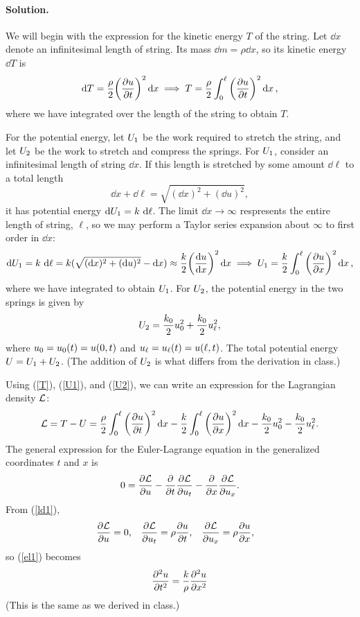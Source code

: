 \documentclass[11pt]{article}
\newcommand{\refeq}[1]{(\ref{#1})}
\newenvironment{solution}
{
    \paragraph{Solution.}
    \ignorespaces
}
{
}
\begin{document}
\begin{solution}
	We will begin with the expression for the kinetic energy $T$ of the string.  Let $\dd{x}$ denote an infinitesimal length of string.  Its mass $\dd{m} = \rho \dd{x}$, so its kinetic energy $\dd{T}$ is
\begin{equation} \label{T}
	\dd{T} = \frac{\rho}{2} \bigg( \pdv{u}{t} \bigg)^2 \dd{x} \implies T = \frac{\rho}{2} \int_0^\ell \bigg( \pdv{u}{t} \bigg)^2 \dd{x},
\end{equation}
	where we have integrated over the length of the string to obtain $T$.
	
	For the potential energy, let $U_1$ be the work required to stretch the string, and let $U_2$ be the work to stretch and compress the springs.  For $U_1$, consider an infinitesimal length of string $\dd{x}$.  If this length is stretched by some amount $\dd{\ell}$ to a total length
	\begin{equation}
		\dd{x} + \dd{\ell} = \sqrt{(\dd{x})^2 + (\dd{u})^2},
	\end{equation}
	it has potential energy $\dd{U_1} = k \,\dd{\ell}$.  The limit $\dd{x} \to \infty$ respresents the entire length of string, $\ell$, so we may perform a Taylor series expansion about $\infty$ to first order in $\dd{x}$:
	\begin{equation} \label{U1}
		\dd{U_1} = k \,\dd{\ell} = k (\sqrt{(\dd{x})^2 + (\dd{u})^2} - \dd{x}) \approx \frac{k}{2} \bigg( \dv{u}{x} \bigg)^2 \dd{x} \implies U_1 = \frac{k}{2} \int_0^\ell \bigg( \pdv{u}{x} \bigg)^2 \dd{x},
	\end{equation}
	where we have integrated to obtain $U_1$.  For $U_2$, the potential energy in the two springs is given by
	\begin{equation} \label{U2}
		U_2 = \frac{k_0}{2} u_0^2 + \frac{k_0}{2} u_\ell^2,
	\end{equation}
	where $u_0 = u_0(t) = u(0, t)$ and $u_\ell = u_\ell(t) = u(\ell, t)$.  The total potential energy $U = U_1 + U_2$.  (The addition of $U_2$ is what differs from the derivation in class.)
	
	Using \refeq{T}, \refeq{U1}, and \refeq{U2}, we can write an expression for the Lagrangian density $\mathcal{L}$:
	\begin{equation} \label{ld1}
		\mathcal{L} = T - U = \frac{\rho}{2} \int_0^\ell \bigg( \pdv{u}{t} \bigg)^2 \dd{x} - \frac{k}{2} \int_0^\ell \bigg( \pdv{u}{x} \bigg)^2 \dd{x} - \frac{k_0}{2} u_0^2 - \frac{k_0}{2} u_\ell^2.
	\end{equation}
	The general expression for the Euler-Lagrange equation in the generalized coordinates $t$ and $x$ is
	\begin{equation} \label{el1}
		0 = \pdv{\mathcal{L}}{u} - \pdv{t} \pdv{\mathcal{L}}{u_t} - \pdv{x} \pdv{\mathcal{L}}{u_x}.
	\end{equation}
	From \refeq{ld1},
	\begin{align} \label{devs}
		\pdv{\mathcal{L}}{u} &= 0, &
		\pdv{\mathcal{L}}{u_t} &= \rho \pdv{u}{t}, &
		\pdv{\mathcal{L}}{u_x} &= \rho \pdv{u}{x},
	\end{align}
	so \refeq{el1} becomes
	\begin{equation} \label{el}
		\pdv[2]{u}{t} = \frac{k}{\rho} \pdv[2]{u}{x}
	\end{equation}
	(This is the same as we derived in class.)
	

\end{solution}
\end{document}
